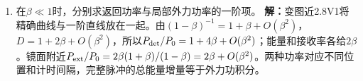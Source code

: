 \documentclass[UTF8,fontset=fandol,a4paper,11pt]{ctexart}
\begin{document}
\begin{enumerate}
\item 在$\beta\ll1$时，分别求返回功率与局部外力功率的一阶项。
\textbf{解：}变图近2.8V1将精确曲线与一阶直线放在一起。由$(1-\beta)^{-1}=1+\beta+O(\beta^2)$，$D=1+2\beta+O(\beta^2)$，所以$P_{\rm det}/P_0=1+4\beta+O(\beta^2)$；能量和接收率各给$2\beta$。镜面附近$P_{\rm ext}/P_0=2\beta(1+\beta)/(1-\beta)=2\beta+O(\beta^2)$。两种功率对应不同位置和计时间隔，完整脉冲的总能量增量等于外力功积分。
\begin{center}\begin{minipage}{.98\linewidth}\centering
{}
\end{minipage}
\end{center}
\end{enumerate}
\end{document}
